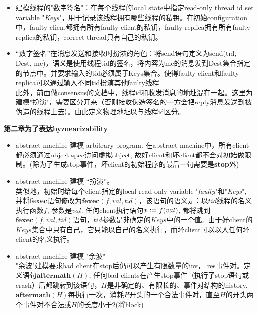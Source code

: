 \documentclass[UTF8, 8pt, a4paper ]{ctexart}
\begin{document}
\begin{small}
\begin{itemize}
\begin{itemize}
\begin{itemize}
\begin{itemize}
					\item  建模线程的"数字签名"：在每个线程的local state中指定read-only thread id set variable "\textit{Keys}"，用于记录该线程拥有哪些线程的私钥。在初始configuration中，faulty client都拥有所有faulty client的私钥，faulty replica拥有所有faulty replica的私钥，correct thread只有自己的私钥。
					
					\item  “数字签名”在消息发送和接收时扮演的角色：将send语句定义为send(tid, Dest, mc)，语义是使用线程tid的签名，将内容为mc的消息发到Dest集合指定的节点中。并要求输入的tid必须属于Keys集合。使得faulty client和faulty replica可以通过输入不同tid扮演其他faulty线程\\
					此外，前面做consensus的文档中，线程id和收发消息的地址混在一起。这里为建模"扮演"，需要区分开来（否则接收伪造签名的一方会把reply消息发送到被伪造的线程上去）。由此定义物理地址以与线程id区分。
				\end{itemize}
			\end{itemize}
		\end{itemize}
	\end{itemize}

	\textbf{第二章为了表达byznearizability}
	\begin{itemize}
		\item abstract machine 建模 arbitrary program. 在abstract machine中，所有client都必须通过object spec访问虚拟object, 故好client和坏client都不会对初始做限制。(除为了生成stop事件，坏client的初始程序的最后一句需要是\textbf{stop}外)
			
		\item abstract machine 建模 “扮演”。\\
			类似地，初始时给每个client指定的local read-only variable "\textit{faulty}"和"\textit{Keys}", 并将\textbf{fexec}语句修改为$ \textbf{fexec}(f, val, tid) $，该语句的语义是：以$ {tid} $线程的名义执行函数$ f $, 参数是$ val $. 任何client执行语句$ x \!\!\ :=\ \!\! f(val) $, 都将跳到$ \textbf{fexec}(f, val, tid) $语句，$ tid $参数是非确定的$ \textit{Keys} $中的一个值。由于好client的$ \textit{Keys} $集合中只有自己，它只能以自己的名义执行，而坏client可以以人任何坏client的名义执行。
		
		\item abstract machine 建模 "余波"\\
			"余波"建模要求bad client在stop后仍可以产生有限数量的inv， res事件对。定义语句$ \textbf{aftermath}(H) $, 任何bad clients在产生stop事件（执行了stop语句或crash）后都跳转到该语句，$ H $是非确定的、有限长的、事件对结构的history. $ \textbf{aftermath}(H) $每执行一次，消耗$ H $开头的一个合法事件对，直至$ H $的开头两个事件对不合法或$ H $的长度小于2(将block)
		

\end{itemize}
\end{small}
\end{document}
